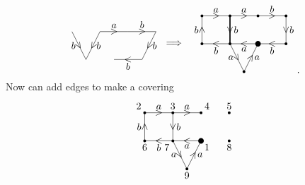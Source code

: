 \begin{example}
$$\begin{tikzpicture}
\draw (-1.5, 1) to node{\rotatebox{30}{$ \vee $}} node[left]{$ b $} (-1, 0);
\draw (-0.5, 1) to node{\rotatebox{60}{$ < $}} node[right]{$ b $} (-1, 0);
\draw (-0.5, 1) to node{$ > $} node[above]{$ a $} (0.5, 1);
\draw (0.5, 1) to node{$ > $} node[above]{$ b $} (1.5, 1);
\draw (1.5, 1) to node{\rotatebox{60}{$ < $}} node[right]{$ b $} (1, 0);
\draw (1, 0) to node{$ < $} node[below]{$ b $} (0, 0);
\end{tikzpicture}
\begin{tikzpicture}
\draw (-3, 0) node{$ \implies $};
\fill (0, 0) circle (0.1);
\fill (-1, 0) circle (0.05);
\fill (-0.5, -1) circle (0.05);
\fill (-2, 0) circle (0.05);
\fill (-2, 1) circle (0.05);
\fill (-1, 1) circle (0.05);
\fill (0, 1) circle (0.05);
\fill (1, 1) circle (0.05);
\fill (1, 0) circle (0.05);
\draw (0, 0) to node{$ < $} node[below]{$ a $} (-1, 0);
\draw (-1, 0) to node{\rotatebox{30}{$ \vee $}} node[left]{$ a $} (-0.5, -1);
\draw (-0.5, -1) to node{\rotatebox{60}{$ > $}} node[right]{$ a $} (0, 0);
\draw (-1, 0) to node{$ < $} node[below]{$ b $} (-2, 0);
\draw (-2, 0) to node{$ \wedge $} node[left]{$ b $} (-2, 1);
\draw (-2, 1) to node{$ > $} node[above]{$ a $} (-1, 1);
\draw [very thick] (-1, 1) to node{$ \vee $} node[right]{$ b $} (-1, 0);
\draw (-1, 1) to node{$ > $} node[above]{$ a $} (0, 1);
\draw (0, 1) to node{$ > $} node[above]{$ b $} (1, 1);
\draw (1, 1) to node{$ \vee $} node[right]{$ b $} (1, 0);
\draw (1, 0) to node{$ < $} node[below]{$ b $} (0, 0);
\end{tikzpicture}.
$$
Now can add edges to make a covering
$$
\begin{tikzpicture}
\fill (0, 0) circle (0.1) node[below right]{$ 1 $};
\fill (-1, 0) circle (0.05) node[below left]{$ 7 $};
\fill (-0.5, -1) circle (0.05) node[below]{$ 9 $};
\fill (-2, 0) circle (0.05) node[below]{$ 6 $};
\fill (-2, 1) circle (0.05) node[above left]{$ 2 $};
\fill (-1, 1) circle (0.05) node[above]{$ 3 $};
\fill (0, 1) circle (0.05) node[above right]{$ 4 $};
\fill (1, 1) circle (0.05) node[above]{$ 5 $};
\fill (1, 0) circle (0.05) node[below]{$ 8 $};
\draw (0, 0) to node{$ < $} node[below]{$ a $} (-1, 0);
\draw (-1, 0) to node{\rotatebox{30}{$ \vee $}} node[left]{$ a $} (-0.5, -1);
\draw (-0.5, -1) to node{\rotatebox{60}{$ > $}} node[right]{$ a $} (0, 0);
\draw (-1, 0) to node{$ < $} node[below]{$ b $} (-2, 0);
\draw (-2, 0) to node{$ \wedge $} node[left]{$ b $} (-2, 1);
\draw (-2, 1) to node{$ > $} node[above]{$ a $} (-1, 1);
\draw (-1, 1) to node{$ \vee $} node[right]{$ b $} (-1, 0);
\draw (-1, 1) to node{$ > $} node[above]{$ a $} (0, 1);

\end{tikzpicture}$$
\end{example}
